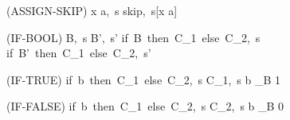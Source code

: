 \begin{center}
	(ASSIGN-SKIP)
	\prooftree
		\justifies
		\langle x \weq a,\ s \rangle \rightarrow \langle skip,\ s[x \mapsto a] \rangle
	\endprooftree
\end{center}

\begin{center}
	(IF-BOOL)
	\prooftree
		\langle B,\ s \rangle \rightarrow \langle B',\ s' \rangle
		\justifies
		\langle if\ B\ then\ C_1\ else\ C_2,\ s \rangle \rightarrow \langle if\ B'\ then\ C_1\ else\ C_2,\ s' \rangle
	\endprooftree
\end{center}

\begin{center}
	(IF-TRUE)
	\prooftree
		\justifies
		\langle if\ b\ then\ C_1\ else\ C_2,\ s \rangle \rightarrow \langle C_1,\ s \rangle
		\using b \sqsubseteq_B 1
	\endprooftree
\end{center}

\begin{center}
	(IF-FALSE)
	\prooftree
		\justifies
		\langle if\ b\ then\ C_1\ else\ C_2,\ s \rangle \rightarrow \langle C_2,\ s \rangle
		\using b \sqsubseteq_B 0
	\endprooftree
\end{center}
